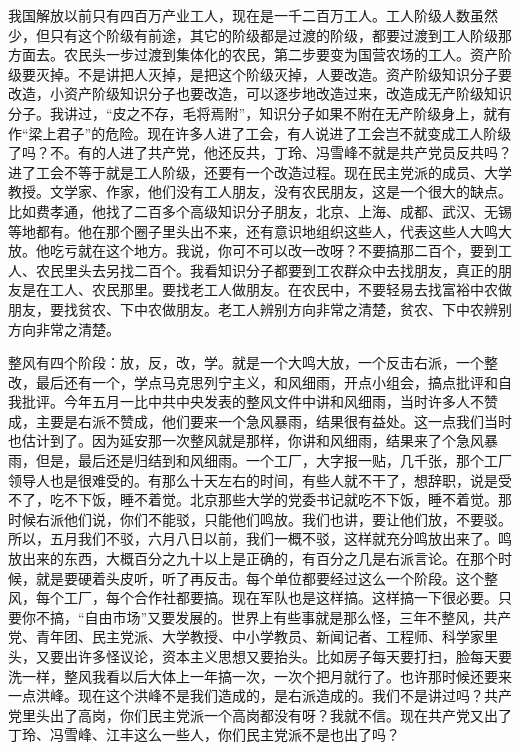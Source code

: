 我国解放以前只有四百万产业工人，现在是一千二百万工人。工人阶级人数虽然少，但只有这个阶级有前途，其它的阶级都是过渡的阶级，都要过渡到工人阶级那方面去。农民头一步过渡到集体化的农民，第二步要变为国营农场的工人。资产阶级要灭掉。不是讲把人灭掉，是把这个阶级灭掉，人要改造。资产阶级知识分子要改造，小资产阶级知识分子也要改造，可以逐步地改造过来，改造成无产阶级知识分子。我讲过，“皮之不存，毛将焉附”，知识分子如果不附在无产阶级身上，就有作“梁上君子”的危险。现在许多人进了工会，有人说进了工会岂不就变成工人阶级了吗？不。有的人进了共产党，他还反共，丁玲、冯雪峰不就是共产党员反共吗？进了工会不等于就是工人阶级，还要有一个改造过程。现在民主党派的成员、大学教授。文学家、作家，他们没有工人朋友，没有农民朋友，这是一个很大的缺点。比如费孝通，他找了二百多个高级知识分子朋友，北京、上海、成都、武汉、无锡等地都有。他在那个圈子里头出不来，还有意识地组织这些人，代表这些人大鸣大放。他吃亏就在这个地方。我说，你可不可以改一改呀？不要搞那二百个，要到工人、农民里头去另找二百个。我看知识分子都要到工农群众中去找朋友，真正的朋友是在工人、农民那里。要找老工人做朋友。在农民中，不要轻易去找富裕中农做朋友，要找贫农、下中农做朋友。老工人辨别方向非常之清楚，贫农、下中农辨别方向非常之清楚。

整风有四个阶段：放，反，改，学。就是一个大鸣大放，一个反击右派，一个整改，最后还有一个，学点马克思列宁主义，和风细雨，开点小组会，搞点批评和自我批评。今年五月一比中共中央发表的整风文件中讲和风细雨，当时许多人不赞成，主要是右派不赞成，他们要来一个急风暴雨，结果很有益处。这一点我们当时也估计到了。因为延安那一次整风就是那样，你讲和风细雨，结果来了个急风暴雨，但是，最后还是归结到和风细雨。一个工厂，大字报一贴，几千张，那个工厂领导人也是很难受的。有那么十天左右的时间，有些人就不干了，想辞职，说是受不了，吃不下饭，睡不着觉。北京那些大学的党委书记就吃不下饭，睡不着觉。那时候右派他们说，你们不能驳，只能他们鸣放。我们也讲，要让他们放，不要驳。所以，五月我们不驳，六月八日以前，我们一概不驳，这样就充分鸣放出来了。鸣放出来的东西，大概百分之九十以上是正确的，有百分之几是右派言论。在那个时候，就是要硬着头皮听，听了再反击。每个单位都要经过这么一个阶段。这个整风，每个工厂，每个合作社都要搞。现在军队也是这样搞。这样搞一下很必要。只要你不搞，“自由市场”又要发展的。世界上有些事就是那么怪，三年不整风，共产党、青年团、民主党派、大学教授、中小学教员、新闻记者、工程师、科学家里头，又要出许多怪议论，资本主义思想又要抬头。比如房子每天要打扫，脸每天要洗一样，整风我看以后大体上一年搞一次，一次个把月就行了。也许那时候还要来一点洪峰。现在这个洪峰不是我们造成的，是右派造成的。我们不是讲过吗？共产党里头出了高岗，你们民主党派一个高岗都没有呀？我就不信。现在共产党又出了丁玲、冯雪峰、江丰这么一些人，你们民主党派不是也出了吗？

